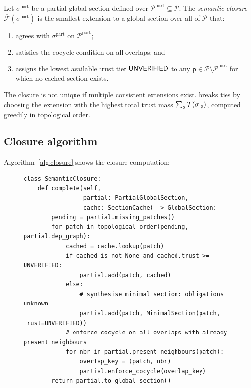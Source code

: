 \documentclass[11pt]{article}
\newcommand{\Patch}{\mathsf{p}}
\newcommand{\PatchSet}{\mathcal{P}}
\newcommand{\SemanticClosure}{\overline{\mathcal{F}}}
\newcommand{\GS}{\sigma}                   %
\begin{document}
\begin{definition}
\label{def:sem-closure}
Let $\GS^{\mathrm{part}}$ be a partial global section defined over
$\PatchSet^{\mathrm{part}} \subseteq \PatchSet$.  The \emph{semantic
closure} $\SemanticClosure(\GS^{\mathrm{part}})$ is the smallest
extension to a global section over all of $\PatchSet$ that:
\begin{enumerate}
\item agrees with $\GS^{\mathrm{part}}$ on $\PatchSet^{\mathrm{part}}$;
\item satisfies the cocycle condition on all overlaps; and
\item assigns the lowest available trust tier $\mathsf{UNVERIFIED}$ to any
  $\Patch \in \PatchSet \setminus \PatchSet^{\mathrm{part}}$ for which no
  cached section exists.
\end{enumerate}
\end{definition}

\begin{remark}
The closure is not unique if multiple consistent extensions exist.
\JuGeo{} breaks ties by choosing the extension with the highest
total trust mass $\sum_\Patch \trust(\GS|_\Patch)$, computed greedily in
topological order.
\end{remark}

\subsection{Closure algorithm}

Algorithm~\ref{alg:closure} shows the closure computation:

\begin{figure}[htbp]
\begin{lstlisting}[style=jugeo-python, caption={Semantic closure
  completion in \texttt{SemanticClosure.complete()}.},
  label={alg:closure}]
class SemanticClosure:
    def complete(self,
                 partial: PartialGlobalSection,
                 cache: SectionCache) -> GlobalSection:
        pending = partial.missing_patches()
        for patch in topological_order(pending, partial.dep_graph):
            cached = cache.lookup(patch)
            if cached is not None and cached.trust >= UNVERIFIED:
                partial.add(patch, cached)
            else:
                # synthesise minimal section: obligations unknown
                partial.add(patch, MinimalSection(patch, trust=UNVERIFIED))
            # enforce cocycle on all overlaps with already-present neighbours
            for nbr in partial.present_neighbours(patch):
                overlap_key = (patch, nbr)
                partial.enforce_cocycle(overlap_key)
        return partial.to_global_section()
\end{lstlisting}
\end{figure}
\end{document}
